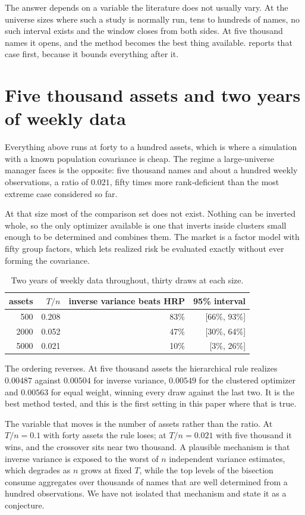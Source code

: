 \documentclass[11pt]{article}
\begin{document}
The answer depends on a variable the literature does not usually vary. At the
universe sizes where such a study is normally run, tens to hundreds of names,
no such interval exists and the window closes from both sides. At five
thousand names it opens, and the method becomes the best thing available.
 reports that case first, because it bounds everything after
it.

\section{Five thousand assets and two years of weekly data}
\label{sec:huge}

Everything above runs at forty to a hundred assets, which is where a
simulation with a known population covariance is cheap. The regime a
large-universe manager faces is the opposite: five thousand names and about a
hundred weekly observations, a ratio of $0.021$, fifty times more
rank-deficient than the most extreme case considered so far.

At that size most of the comparison set does not exist. Nothing can be
inverted whole, so the only optimizer available is one that inverts inside
clusters small enough to be determined and combines them. The market is a
factor model with fifty group factors, which lets realized risk be evaluated
exactly without ever forming the covariance.

\begin{table}[ht]
\centering
\begin{tabular}{rrrr}
\toprule
assets & $T/n$ & inverse variance beats HRP & 95\% interval \\
\midrule
500  & 0.208 & 83\% & [66\%, 93\%] \\
2000 & 0.052 & 47\% & [30\%, 64\%] \\
5000 & 0.021 & 10\% & [3\%, 26\%] \\
\bottomrule
\end{tabular}
\caption{Two years of weekly data throughout, thirty draws at each size.}
\label{tab:huge}
\end{table}

The ordering reverses. At five thousand assets the hierarchical rule realizes
$0.00487$ against $0.00504$ for inverse variance, $0.00549$ for the clustered
optimizer and $0.00563$ for equal weight, winning every draw against the last
two. It is the best method tested, and this is the first setting in this paper
where that is true.

The variable that moves is the number of assets rather than the ratio. At
$T/n = 0.1$ with forty assets the rule loses; at $T/n = 0.021$ with five
thousand it wins, and the crossover sits near two thousand. A plausible
mechanism is that inverse variance is exposed to the worst of $n$ independent
variance estimates, which degrades as $n$ grows at fixed $T$, while the top
levels of the bisection consume aggregates over thousands of names that are
well determined from a hundred observations. We have not isolated that
mechanism and state it as a conjecture.
\end{document}
